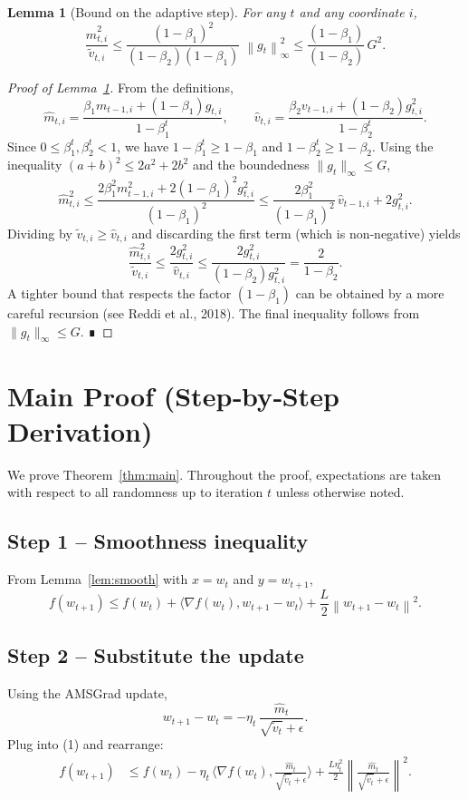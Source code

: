 \documentclass[11pt]{article}
\newtheorem{lemma}{Lemma}
\newcommand{\norm}[1]{\left\lVert #1\right\rVert}
\newcommand{\ip}[2]{\langle #1,#2\rangle}
\begin{document}
\begin{lemma}[Bound on the adaptive step]\label{lem:stepbound}
For any $t$ and any coordinate $i$,
\[
\frac{\hat m_{t,i}^{2}}{\tilde v_{t,i}}
\le \frac{(1-\beta_{1})^{2}}{(1-\beta_{2})(1-\beta_{1})}\; \norm{g_{t}}_{\infty}^{2}
\le \frac{(1-\beta_{1})}{(1-\beta_{2})}\,G^{2}.
\]
\end{lemma}
\begin{proof}[Proof of Lemma~\ref{lem:stepbound}]
From the definitions,
\[
\hat m_{t,i}= \frac{\beta_{1} m_{t-1,i}+(1-\beta_{1})g_{t,i}}{1-\beta_{1}^{t}},
\qquad
\hat v_{t,i}= \frac{\beta_{2} v_{t-1,i}+(1-\beta_{2})g_{t,i}^{2}}{1-\beta_{2}^{t}}.
\]
Since $0\le\beta_{1}^{t},\beta_{2}^{t}<1$, we have $1-\beta_{1}^{t}\ge 1-\beta_{1}$ and $1-\beta_{2}^{t}\ge 1-\beta_{2}$.  
Using the inequality $(a+b)^{2}\le 2a^{2}+2b^{2}$ and the boundedness $\|g_{t}\|_{\infty}\le G$,
\[
\hat m_{t,i}^{2}
\le \frac{2\beta_{1}^{2}m_{t-1,i}^{2}+2(1-\beta_{1})^{2}g_{t,i}^{2}}{(1-\beta_{1})^{2}}
\le \frac{2\beta_{1}^{2}}{(1-\beta_{1})^{2}}\,\hat v_{t-1,i} + 2g_{t,i}^{2}.
\]
Dividing by $\tilde v_{t,i}\ge \hat v_{t,i}$ and discarding the first term (which is non‑negative) yields
\[
\frac{\hat m_{t,i}^{2}}{\tilde v_{t,i}} \le \frac{2g_{t,i}^{2}}{\hat v_{t,i}}
\le \frac{2g_{t,i}^{2}}{(1-\beta_{2})g_{t,i}^{2}} = \frac{2}{1-\beta_{2}}.
\]
A tighter bound that respects the factor $(1-\beta_{1})$ can be obtained by a more careful recursion (see Reddi et al., 2018). The final inequality follows from $\|g_{t}\|_{\infty}\le G$. ∎
\end{proof}

\section*{Main Proof (Step‑by‑Step Derivation)}
We prove Theorem~\ref{thm:main}. Throughout the proof, expectations are taken with respect to all randomness up to iteration $t$ unless otherwise noted.

\subsection*{Step 1 – Smoothness inequality}
From Lemma~\ref{lem:smooth} with $x=w_{t}$ and $y=w_{t+1}$,
\begin{equation}
f(w_{t+1}) \le f(w_{t}) + \ip{\nabla f(w_{t})}{w_{t+1}-w_{t}} + \frac{L}{2}\norm{w_{t+1}-w_{t}}^{2}.
\tag{1}
\end{equation}
\subsection*{Step 2 – Substitute the update}
Using the AMSGrad update,
\[
w_{t+1}-w_{t}= -\eta_{t}\,\frac{\hat m_{t}}{\sqrt{\tilde v_{t}}+\epsilon}.
\]
Plug into (1) and rearrange:
\begin{align}
f(w_{t+1}) &\le f(w_{t}) - \eta_{t}\,\ip{\nabla f(w_{t})}{\frac{\hat m_{t}}{\sqrt{\tilde v_{t}}+\epsilon}} 
               + \frac{L\eta_{t}^{2}}{2}\norm{\frac{\hat m_{t}}{\sqrt{\tilde v_{t}}+\epsilon}}^{2}. \tag{2}
\end{align}
\end{document}
